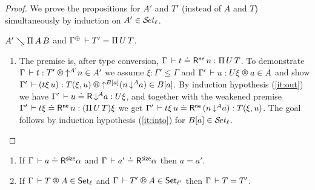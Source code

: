 \documentclass[acmlarge,review,anonymous]{acmart}\settopmatter{printfolios=true}
\begin{document}
\begin{proof}
We prove the propositions for $A'$ and $T'$ (instead of $A$ and $T$)
simultaneously by induction on $A' \in \SET[\ell]$.

\begin{caselist}

\nextcase $A' \evalsto \piT A B$ and $\resurrect\Gamma \der T' = \piT U T$.
\begin{enumerate}
\item
The premise is, after type conversion, $\Gamma \der t \doteq \tRne\, n : \piT U T$.
To demonstrate $\LR \Gamma t {T'} {\up {A'} n} {A'}$ we assume
$\xi : \Gamma' \leq \Gamma$ and $\LR{\Gamma'}{u}{U\xi} a A$ and show
$\LR{\Gamma'} {(t\xi\,u)} {T(\xi,u)} {\up{B[a]}(n\,\down A a)} {B[a]}$.
By induction hypothesis (\ref{it:out}) we have $\RD {\Gamma'} u {\down A a} {U\xi}$, and
together with the weakened premise $\Gamma' \der t\xi \doteq \tRne\, n : (\piT U T) \xi$ we get
$\Gamma' \der t\xi\, u \doteq \tRne\, (n\,\down A a) : T(\xi,u)$.
The goal follows by induction hypothesis (\ref{it:into}) for $B[a] \in \SET[\ell]$.
\end{enumerate}
\end{caselist}
\end{proof}

\begin{corollary}
\label{cor:oneone}
\bla
\begin{enumerate}
\item
If $\LRSize \Gamma a \alpha$ and $\LRSize \Gamma {a'} \alpha$ then $a = a'$.
\item
If $\LRT \Gamma T A \ell$ and $\LRT \Gamma {T'} A {\ell'}$ then $\Gamma \der T = T'$.
\end{enumerate}
\end{corollary}
\end{document}
